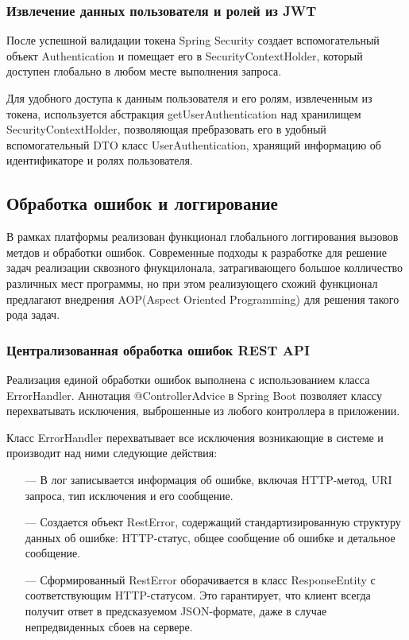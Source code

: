 \subsubsection{Извлечение данных пользователя и ролей из JWT}

После успешной валидации токена Spring Security создает вспомогательный объект Authentication и помещает его в SecurityContextHolder, который доступен глобально в любом месте выполнения запроса.

Для удобного доступа к данным пользователя и его ролям, извлеченным из токена, используется абстракция getUserAuthentication над хранилищем SecurityContextHolder, позволяющая пребразовать его в удобный вспомогательный DTO класс UserAuthentication, хранящий информацию об идентификаторе и ролях пользователя.

\subsection{Обработка ошибок и логгирование}

В рамках платформы реализован функционал глобального логгирования вызовов метдов и обработки ошибок. 
Современные подходы к разработке для решение задач реализации сквозного фнукцилонала, затрагивающего большое колличество различных мест программы, но при этом реализующего схожий функционал предлагают внедрения AOP(Aspect Oriented Programming)\cite{kiczales1997aspect} для решения такого рода задач. 

\subsubsection{Централизованная обработка ошибок REST API}

Реализация единой обработки ошибок выполнена с использованием класса ErrorHandler. Аннотация @ControllerAdvice в Spring Boot позволяет классу перехватывать исключения, выброшенные из любого контроллера в приложении.

Класс ErrorHandler перехватывает все исключения возникающие в системе и производит над ними следующие действия:

\begin{itemize}
  \item[---]В лог записывается информация об ошибке, включая HTTP-метод, URI запроса, тип исключения и его сообщение.
  \item[---]Создается объект RestError, содержащий стандартизированную структуру данных об ошибке: HTTP-статус, общее сообщение об ошибке и детальное сообщение.
  \item[---]Сформированный RestError оборачивается в класс ResponseEntity с соответствующим HTTP-статусом. Это гарантирует, что клиент всегда получит ответ в предсказуемом JSON-формате, даже в случае непредвиденных сбоев на сервере.
\end{itemize}

